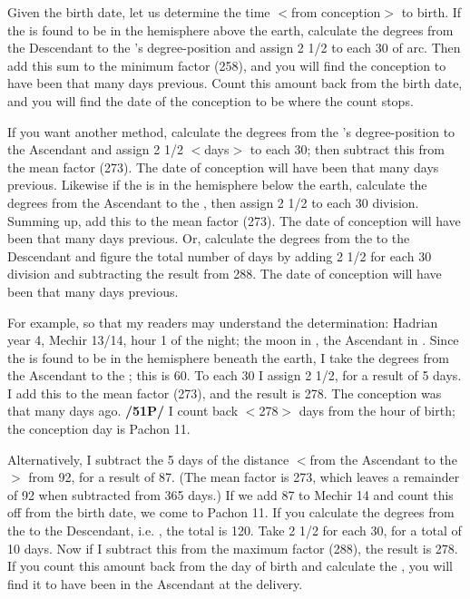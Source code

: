 Given the birth date, let us determine the time $<$from conception$>$ to birth. If the \Moon\xspace is found to be in the hemisphere above the earth, calculate the degrees from the Descendant to the \Moon’s degree-position and assign 2 1/2 to each 30\deg\xspace of arc. Then add this sum to the minimum factor (258), and you will find the conception to have been that many days previous. Count this amount back from the birth date, and you will find the date of the conception to be where the count stops.

If you want another method, calculate the degrees from the \Moon’s degree-position to the Ascendant and assign 2 1/2 $<$days$>$ to each 30\deg; then subtract this from the mean factor (273). The date of conception will have been that many days previous. Likewise if the \Moon\xspace is in the hemisphere below the earth, calculate the degrees from the Ascendant to the \Moon, then assign 2 1/2 to each 30\deg\xspace division. Summing up, add this to the mean factor (273). The date of conception will have been that many days previous. Or, calculate the degrees from the \Moon\xspace to the Descendant and figure the total number of days by adding 2 1/2 for each 30\deg\xspace division and subtracting the result from 288. The date of conception will have been that many days previous.

For example, so that my readers may understand the determination: Hadrian year 4, Mechir 13/14, hour 1 of the night; the moon in \Scorpio\xspace 7\deg, the Ascendant in \Virgo\xspace 7\deg. Since the \Moon\xspace is found to be in
the hemisphere beneath the earth, I take the degrees from the Ascendant to the \Moon; this is 60\deg. To each 30\deg\xspace I assign 2 1/2, for a result of 5 days. I add this to the mean factor (273), and the result is 278. The conception was that many days ago. \textbf{/51P/} I count back $<$278$>$ days from the hour of birth; the conception day is Pachon 11.

Alternatively, I subtract the 5 days of the distance $<$from the Ascendant to the \Moon$>$ from 92, for a result of 87. (The mean factor is 273, which leaves a remainder of 92 when subtracted from 365 days.) If we add 87 to Mechir 14 and count this off from the birth date, we come to Pachon 11. If you calculate the degrees from the \Moon\xspace to the Descendant, i.e. \Pisces\xspace 7\deg, the total is 120\deg. Take 2
1/2 for each 30\deg, for a total of 10 days. Now if I subtract this from the maximum factor (288), the result is 278. If you count this amount back from the day of birth and calculate the \Moon, you will find it to have been in the Ascendant at the delivery.

